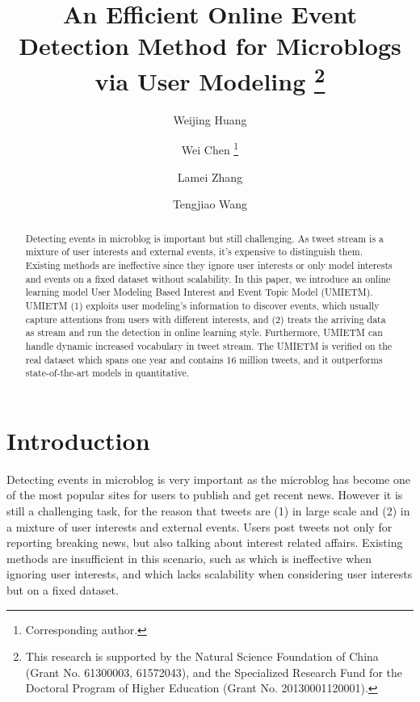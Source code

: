 \documentclass[runningheads,a4paper]{llncs}
\title{An Efficient Online Event Detection Method for Microblogs via User Modeling \thanks{This research is supported by the Natural Science Foundation of China (Grant No. 61300003, 61572043), and the Specialized Research Fund for the Doctoral Program of Higher Education (Grant No. 20130001120001).}}
\begin{document}
\author{Weijing Huang \and Wei Chen \thanks{Corresponding author.}\and Lamei Zhang\and Tengjiao Wang}
%
\maketitle
\thispagestyle{empty}
\pagestyle{empty}
%
%

\begin{abstract}
Detecting events in microblog is important but still challenging. As tweet stream is a mixture of user interests and external events, it's expensive to distinguish them.
Existing methods are ineffective since they ignore user interests or only model interests and events on a fixed dataset without scalability. In this paper, we introduce an online learning model User Modeling Based Interest and Event Topic Model (UMIETM). UMIETM (1) exploits user modeling's information to discover events, which usually capture attentions from users with different interests, and (2) treats the arriving data as stream and run the detection in online learning style. Furthermore, UMIETM can handle dynamic increased vocabulary in tweet stream. The UMIETM is verified on the real dataset which spans one year and contains 16 million tweets, and it outperforms state-of-the-art models in quantitative.
\end{abstract}
\section{Introduction}
Detecting events in microblog is very important as the microblog has become one of the most popular sites for users to publish and get recent news.
However it is still a challenging task, for the reason that tweets are (1) in large scale and (2) in a mixture of user interests and external events.
Users post tweets not only for reporting breaking news, but also talking about interest related affairs.
Existing methods are insufficient in this scenario, such as \cite{lau2012line} which is ineffective when ignoring user interests, and \cite{timeUserLDA2012finding} which lacks scalability when considering user interests but on a fixed dataset.
\end{document}

